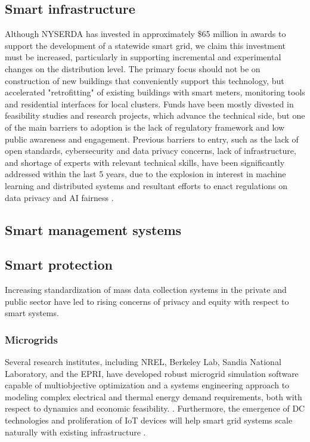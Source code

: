 \documentclass[plain]{article}
\newcommand{\1}{\mathbbm{1}}
\begin{document}
\subsection{Smart infrastructure}
Although NYSERDA has invested in approximately \$65 million in awards to support the development of a statewide smart grid, we claim this investment must be increased, particularly in supporting incremental and experimental changes on the distribution level. The primary focus should not be on construction of new buildings that conveniently support this technology, but accelerated "retrofitting" of existing buildings with smart meters, monitoring tools and residential interfaces for local clusters.
Funds have been mostly divested in feasibility studies and research projects, which advance the technical side, but one of the main barriers to adoption is the lack of regulatory framework and low public awareness and engagement. Previous barriers to entry, such as the lack of open standards, cybersecurity and data privacy concerns, lack of infrastructure, and shortage of experts with relevant technical skills, have been significantly addressed within the last 5 years, due to the explosion in interest in machine learning and distributed systems and resultant efforts to enact regulations on data privacy and AI fairness .

\subsection{Smart management systems}


\subsection{Smart protection}
Increasing standardization of mass data collection systems in the private and public sector have led to rising concerns of privacy and equity with respect to smart systems. 

\subsubsection{Microgrids}
Several research institutes, including NREL, Berkeley Lab, Sandia National Laboratory, and the EPRI, have developed robust microgrid simulation software capable of multiobjective optimization and a systems engineering approach to modeling complex electrical and thermal energy demand requirements, both with respect to dynamics and economic feasibility. . Furthermore, the emergence of DC technologies and proliferation of IoT devices will help smart grid systems scale naturally with existing infrastructure .
\end{document}
